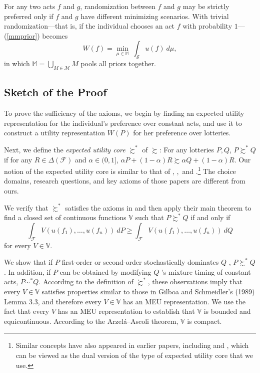 \documentclass[12pt, notitlepage]{article}
\begin{document}
For any two acts $f$ and $g$, randomization between $f$ and $g$ may be
strictly preferred only if $f$ and $g$ have different minimizing scenarios.
With trivial randomization---that is, if the individual chooses an act $f$
with probability $1$---(\ref{mmprior}) becomes%
\begin{equation*}
W(f)=\min_{\mu \in \mathbb{M}}~\int_{\mathcal{S}}u(f)~d\mu ,
\end{equation*}%
in which $\mathbb{M}=\bigcup_{M\in \mathcal{M}}M$ pools all priors together.

\subsection{Sketch of the Proof}

\label{proof}To prove the sufficiency of the axioms, we begin by finding an
expected utility representation for the individual's preference over
constant acts, and use it to construct a utility representation $W(P)$ for
her preference over lotteries.

Next, we define the \textit{expected utility core} $\succsim ^{\ast }$ of $%
\succsim $: For any lotteries $P,Q$, $P\succsim ^{\ast }Q$ if for any $R\in
\Delta (\mathcal{F})$ and $\alpha \in (0,1]$, $\alpha P+(1-\alpha )R\succsim
\alpha Q+(1-\alpha )R$. Our notion of the expected utility core is similar
to that of \cite{Cerreia-Vioglio09}, \cite%
{Cerreia-VioglioDillenbergerOrtoleva15},\ and \cite%
{Cerreia-VioglioMaccheroniMarinacci17}.\footnote{%
Similar concepts have also appeared in earlier papers, including \cite%
{Nehring01} and \cite{GhirardatoMaccheroniMarinacci04}, which can be viewed
as the dual version of the type of expected utility core that we use.} The
choice domains, research questions, and key axioms of those papers are
different from ours.

We verify that $\succsim ^{\ast }$ satisfies the axioms in \cite%
{DubraMaccheroniOk04} and then apply their main theorem to find a closed set
of continuous functions $\mathbb{V}$ such that $P\succsim ^{\ast }Q$ if and
only if%
\begin{equation*}
\int_{\mathcal{F}}V(u(f_{1}),\dots ,u(f_{n}))~dP\geq \int_{\mathcal{F}%
}V(u(f_{1}),\dots ,u(f_{n}))~dQ
\end{equation*}%
for every $V\in \mathbb{V}$.

We show that if $P$ first-order or second-order stochastically dominates $Q$%
, $P\succsim ^{\ast }Q$. In addition, if $P$ can be obtained by modifying $Q$%
's mixture timing of constant acts, $P\sim ^{\ast }Q$. According to the
definition of $\succsim ^{\ast }$, these observations imply that every $V\in 
\mathbb{V}$ satisfies properties similar to those in Gilboa and Schmeidler's
(1989) Lemma 3.3, and therefore every $V\in \mathbb{V}$ has an MEU
representation. We use the fact that every $V$ has an MEU representation to
establish that $\mathbb{V}$ is bounded and equicontinuous. According to the
Arzel\'{a}--Ascoli theorem, $\mathbb{V}$ is compact.
\end{document}

